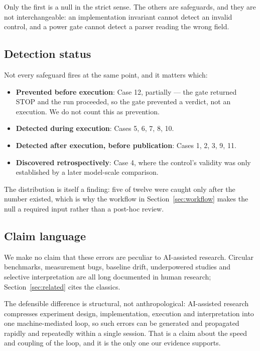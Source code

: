 \documentclass[11pt]{article}
\begin{document}
Only the first is a null in the strict sense. The others are safeguards,
and they are not interchangeable: an implementation invariant cannot detect
an invalid control, and a power gate cannot detect a parser reading the
wrong field.

\subsection{Detection status}

Not every safeguard fires at the same point, and it matters which:

\begin{itemize}
\item \textbf{Prevented before execution}: Case 12, partially --- the gate
  returned STOP and the run proceeded, so the gate prevented a verdict, not
  an execution. We do not count this as prevention.
\item \textbf{Detected during execution}: Cases 5, 6, 7, 8, 10.
\item \textbf{Detected after execution, before publication}: Cases 1, 2, 3,
  9, 11.
\item \textbf{Discovered retrospectively}: Case 4, where the control's
  validity was only established by a later model-scale comparison.
\end{itemize}

The distribution is itself a finding: five of twelve were caught only after
the number existed, which is why the workflow in Section~\ref{sec:workflow}
makes the null a required input rather than a post-hoc review.

\subsection{Claim language}

We make no claim that these errors are peculiar to AI-assisted research.
Circular benchmarks, measurement bugs, baseline drift, underpowered studies
and selective interpretation are all long documented in human research;
Section~\ref{sec:related} cites the classics.

The defensible difference is structural, not anthropological: AI-assisted
research compresses experiment design, implementation, execution and
interpretation into one machine-mediated loop, so such errors can be
generated and propagated rapidly and repeatedly within a single session.
That is a claim about the speed and coupling of the loop, and it is the
only one our evidence supports.
\end{document}
